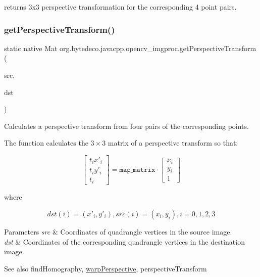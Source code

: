 returns 3x3 perspective transformation for the corresponding 4 point pairs. \mbox{\label{group__imgproc__transform_gaf64ca469bb365e0b906e40ecde6eefe5}} 
\subsubsection{\texorpdfstring{get\+Perspective\+Transform()}{getPerspectiveTransform()}\hspace{0.1cm}{\footnotesize\ttfamily [2/2]}}
{\footnotesize\ttfamily static native Mat org.\+bytedeco.\+javacpp.\+opencv\+\_\+imgproc.\+get\+Perspective\+Transform (\begin{DoxyParamCaption}\item[{@By\+Val Mat}]{src,  }\item[{@By\+Val Mat}]{dst }\end{DoxyParamCaption})\hspace{0.3cm}{\ttfamily [static]}}



Calculates a perspective transform from four pairs of the corresponding points. 

The function calculates the $3 \times 3$ matrix of a perspective transform so that\+: 

\[\begin{bmatrix} t_i x'_i \\ t_i y'_i \\ t_i \end{bmatrix} = \texttt{map_matrix} \cdot \begin{bmatrix} x_i \\ y_i \\ 1 \end{bmatrix}\] 

where 

\[dst(i)=(x'_i,y'_i), src(i)=(x_i, y_i), i=0,1,2,3\] 


\begin{DoxyParams}{Parameters}
{\em src} & Coordinates of quadrangle vertices in the source image. \\
\hline
{\em dst} & Coordinates of the corresponding quadrangle vertices in the destination image. \\
\hline
\end{DoxyParams}
\begin{DoxySeeAlso}{See also}
find\+Homography, \hyperlink{group__imgproc__transform_ga75e1d893d7bf652cd99d608259c00c24}{warp\+Perspective}, perspective\+Transform 
\end{DoxySeeAlso}
\mbox{\label{group__imgproc__transform_gae176a226575415412c0b6ea67126e54e}} 
